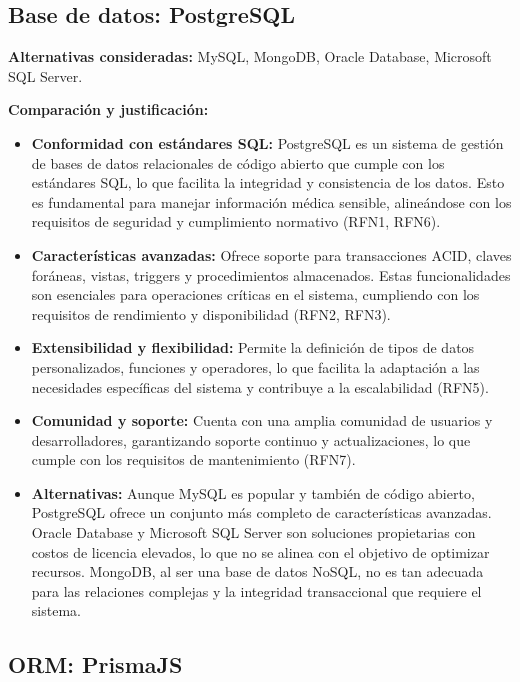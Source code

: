\subsection{Base de datos: PostgreSQL}

\textbf{Alternativas consideradas:} MySQL, MongoDB, Oracle Database, Microsoft SQL Server.

\textbf{Comparación y justificación:}

\begin{itemize} 
	\item \textbf{Conformidad con estándares SQL:} PostgreSQL es un sistema de gestión de bases de datos relacionales de código abierto que cumple con los estándares SQL, lo que facilita la integridad y consistencia de los datos. Esto es fundamental para manejar información médica sensible, alineándose con los requisitos de seguridad y cumplimiento normativo (RFN1, RFN6).
	
	\item \textbf{Características avanzadas:} Ofrece soporte para transacciones ACID, claves foráneas, vistas, triggers y procedimientos almacenados. Estas funcionalidades son esenciales para operaciones críticas en el sistema, cumpliendo con los requisitos de rendimiento y disponibilidad (RFN2, RFN3).
	
	\item \textbf{Extensibilidad y flexibilidad:} Permite la definición de tipos de datos personalizados, funciones y operadores, lo que facilita la adaptación a las necesidades específicas del sistema y contribuye a la escalabilidad (RFN5).
	
	\item \textbf{Comunidad y soporte:} Cuenta con una amplia comunidad de usuarios y desarrolladores, garantizando soporte continuo y actualizaciones, lo que cumple con los requisitos de mantenimiento (RFN7).
	
	\item \textbf{Alternativas:} Aunque MySQL es popular y también de código abierto, PostgreSQL ofrece un conjunto más completo de características avanzadas. Oracle Database y Microsoft SQL Server son soluciones propietarias con costos de licencia elevados, lo que no se alinea con el objetivo de optimizar recursos. MongoDB, al ser una base de datos NoSQL, no es tan adecuada para las relaciones complejas y la integridad transaccional que requiere el sistema.
	
\end{itemize}

\subsection{ORM: PrismaJS}

